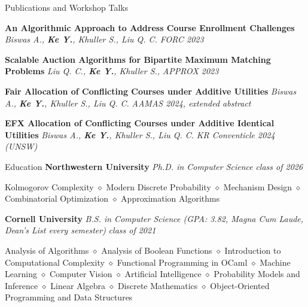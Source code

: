 \documentclass{resume} %
\date{\specialdate\today}
\begin{document}




\begin{rSection}{Publications and Workshop Talks}

{\bf An Algorithmic Approach to Address Course Enrollment Challenges} \textit{Biswas A., \textbf{Ke Y.}, Khuller S., Liu Q. C.}  \hfill {\em FORC 2023}

{\bf Scalable Auction Algorithms for Bipartite Maximum Matching Problems} \textit{Liu Q. C., \textbf{Ke Y.}, Khuller S.,}  \hfill {\em APPROX 2023}

{\bf Fair Allocation of Conflicting Courses under Additive Utilities}  \textit{Biswas A., \textbf{Ke Y.}, Khuller S., Liu Q. C.}  \hfill {\em AAMAS 2024, extended abstract}

{\bf EFX Allocation of Conflicting Courses under Additive Identical Utilities}  \textit{Biswas A., \textbf{Ke Y.}, Khuller S., Liu Q. C.}  \hfill {\em KR Conventicle 2024 (UNSW)}


\end{rSection}

\begin{rSection}{Education}
{\bf Northwestern University} \textit{Ph.D. in Computer Science}  \hfill {\em class of 2026}
\item Kolmogorov Complexity  $\diamond$ Modern Discrete Probability $\diamond$ Mechanism Design  $\diamond$ Combinatorial Optimization  $\diamond$ Approximation Algorithms

{\bf Cornell University} \textit{B.S. in Computer Science (GPA: 3.82, Magna Cum Laude, Dean's List every semester)}  \hfill {\em class of 2021}
\item Analysis of Algorithms  $\diamond$ Analysis of Boolean Functions $\diamond$ Introduction to Computational Complexity $\diamond$ Functional Programming in OCaml $\diamond$ Machine Learning $\diamond$ Computer Vision $\diamond$ Artificial Intelligence $\diamond$ Probability Models and Inference $\diamond$ Linear Algebra $\diamond$ Discrete Mathematics $\diamond$ Object-Oriented Programming and Data Structures

\end{rSection}
\end{document}
